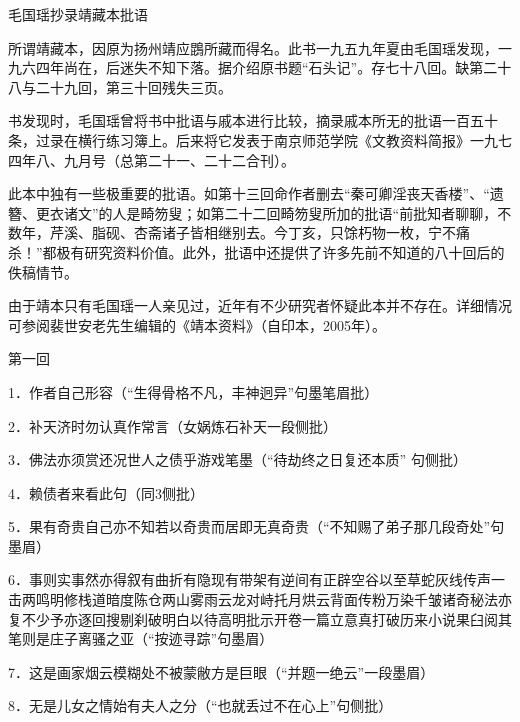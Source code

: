 \newpage

\begin{center}
	{\Huge \heiti 毛国瑶抄录靖藏本批语}
\end{center}






所谓靖藏本，因原为扬州靖应鵾所藏而得名。此书一九五九年夏由毛国瑶发现，一九六四年尚在，后迷失不知下落。据介绍原书题“石头记”。存七十八回。缺第二十八与二十九回，第三十回残失三页。

书发现时，毛国瑶曾将书中批语与戚本进行比较，摘录戚本所无的批语一百五十条，过录在横行练习簿上。后来将它发表于南京师范学院《文教资料简报》一九七四年八、九月号（总第二十一、二十二合刊）。

此本中独有一些极重要的批语。如第十三回命作者删去“秦可卿淫丧天香楼”、“遗簪、更衣诸文”的人是畸笏叟；如第二十二回畸笏叟所加的批语“前批知者聊聊，不数年，芹溪、脂砚、杏斋诸子皆相继别去。今丁亥，只馀朽物一枚，宁不痛杀！”都极有研究资料价值。此外，批语中还提供了许多先前不知道的八十回后的佚稿情节。

由于靖本只有毛国瑶一人亲见过，近年有不少研究者怀疑此本并不存在。详细情况可参阅裴世安老先生编辑的《靖本资料》（自印本，2005年）。

第一回

1．作者自己形容{（\kaishu “生得骨格不凡，丰神迥异”句墨笔眉批）}

2．补天济时勿认真作常言{（\kaishu 女娲炼石补天一段侧批）}

3．佛法亦须赏还况世人之债乎游戏笔墨{（\kaishu “待劫终之日复还本质”
句侧批）}

4．赖债者来看此句{（\kaishu 同3侧批）}

5．果有奇贵自己亦不知若以奇贵而居即无真奇贵{（\kaishu “不知赐了弟子那几段奇处”句墨眉）}

6．事则实事然亦得叙有曲折有隐现有带架有逆间有正辟空谷以至草蛇灰线传声一击两鸣明修栈道暗度陈仓两山雾雨云龙对峙托月烘云背面传粉万染千皱诸奇秘法亦复不少予亦逐回搜剔刹破明白以待高明批示开卷一篇立意真打破历来小说果臼阅其笔则是庄子离骚之亚{（\kaishu “按迹寻踪”句墨眉）}

7．这是画家烟云模糊处不被蒙敝方是巨眼{（\kaishu “并题一绝云”一段墨眉）}

8．无是儿女之情始有夫人之分{（\kaishu “也就丢过不在心上”句侧批）}

